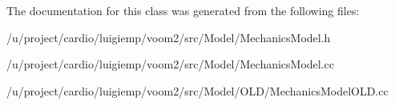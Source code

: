 The documentation for this class was generated from the following files:\begin{DoxyCompactItemize}
\item 
/u/project/cardio/luigiemp/voom2/src/Model/MechanicsModel.h\item 
/u/project/cardio/luigiemp/voom2/src/Model/MechanicsModel.cc\item 
/u/project/cardio/luigiemp/voom2/src/Model/OLD/MechanicsModelOLD.cc\end{DoxyCompactItemize}
